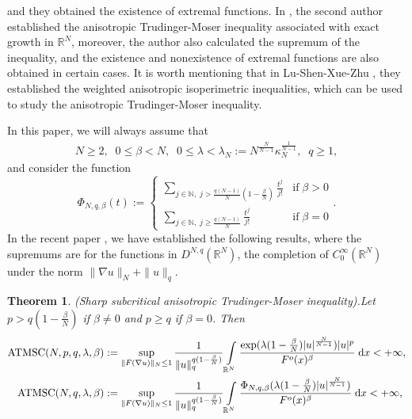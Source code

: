 \documentclass[11pt]{article}
\theoremstyle{plain}
\numberwithin{equation}{section}
\newtheorem{theoremalph}{Theorem}
\newcommand{\R}{\mathbb{R}}
\newcommand{\N}{\mathbb{N}}
\begin{document}
and they  obtained the existence of extremal functions.  In \cite{Liu}, the second author established the anisotropic Trudinger-Moser inequality associated with exact growth in $\R^{N}$,  moreover, the author also calculated the supremum of the inequality, and the existence and nonexistence of extremal functions  are also obtained in certain cases.
It is worth mentioning that in Lu-Shen-Xue-Zhu \cite{Lu-Shen-Xue-Zhu-2024}, they established the weighted anisotropic isoperimetric inequalities, which can be used to study the anisotropic Trudinger-Moser inequality.


In this paper, we will always assume that
\begin{align}\label{eq1.6}
    N\geq 2,\;\;0\leq\beta<N,\;\;0\leq\lambda<\lambda_{N}:=N^{\frac{N}{N-1}}\kappa_{N}^{\frac{1}{N-1}},\;\;q\geq 1,
\end{align}
and consider the function
$$
\Phi_{N,q,\beta}(t):=\left\{\begin{array}{cc}
\sum\limits_{j\in\N,\;j>\frac{q(N-1)}{N}(1-\frac{\beta}{N})}\frac{t^{j}}{j!} & {\mathrm{if}}\;\beta>0 \\
\sum\limits_{j\in\N,\;j\geq\frac{q(N-1)}{N}}\frac{t^{j}}{j!} & {\mathrm{if}}\;\beta=0
\end{array}\right..
$$
In the recent paper \cite{Guo-Liu-2024}, we have established the following results, where the supremums are for the functions in $D^{N,q}(\R^{N})$, the completion of $C_{0}^{\infty}(\R^{N})$ under the norm $\|\nabla u\|_{N}+\|u\|_{q}$.

\begin{theoremalph}(Sharp subcritical anisotropic Trudinger-Moser inequality).\label{tha}
Let $p>q(1-\frac{\beta}{N})$ if $\beta\neq0$ and $p\geq q$ if $\beta=0$. Then
\begin{align}
    \mathrm{ATMSC}(N,p,q,\lambda,\beta)&:=\sup\limits_{\|F(\nabla u)\|_{N}\leq 1}\frac{1}{\|u\|_{q}^{q(1-\frac{\beta}{N})}}\int\limits_{\R^{N}}\frac{\exp(\lambda(1-\frac{\beta}{N})\lvert u\rvert^{\frac{N}{N-1}})\lvert u\rvert^{p}}{F^{o}(x)^{\beta}}\;\mathrm{d}x<+\infty,\notag\\
    \mathrm{ATMSC}(N,q,\lambda,\beta)&:=\sup\limits_{\|F(\nabla u)\|_{N}\leq 1}\frac{1}{\|u\|_{q}^{q(1-\frac{\beta}{N})}}\int\limits_{\R^{N}}\frac{\Phi_{N,q,\beta}(\lambda(1-\frac{\beta}{N})\lvert u\rvert^{\frac{N}{N-1}})}{F^{o}(x)^{\beta}}\;\mathrm{d}x<+\infty,\notag
\end{align}
\end{theoremalph}
\end{document}
